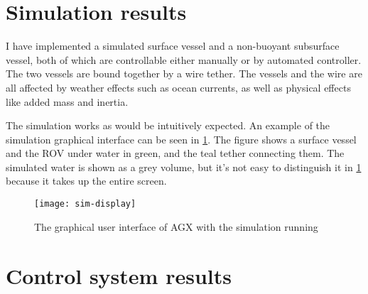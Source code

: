 
\section{Simulation results}
I have implemented a simulated surface vessel and a non-buoyant subsurface vessel, both of which are controllable either manually or by automated controller. The two vessels are bound together by a wire tether. The vessels and the wire are all affected by weather effects such as ocean currents, as well as physical effects like added mass and inertia. 

The simulation works as would be intuitively expected. An example of the simulation graphical interface can be seen in \cref{fig:sim-display}. The figure shows a surface vessel and the ROV under water in green, and the teal tether connecting them. The simulated water is shown as a grey volume, but it's not easy to distinguish it in \cref{fig:sim-display} because it takes up the entire screen. 

\begin{figure}
	\centering
	\texttt{[image: sim-display]}
	\caption{The graphical user interface of AGX with the simulation running}
	\label{fig:sim-display}
\end{figure}


\section{Control system results}
